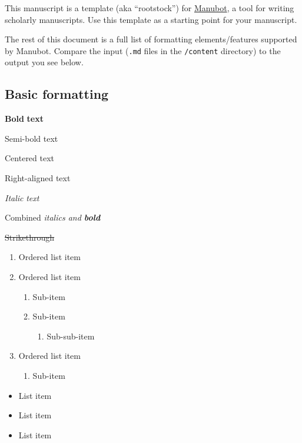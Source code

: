 This manuscript is a template (aka ``rootstock'') for \href{https://manubot.org/}{Manubot}, a tool for writing scholarly manuscripts.
Use this template as a starting point for your manuscript.

The rest of this document is a full list of formatting elements/features supported by Manubot.
Compare the input (\texttt{.md} files in the \texttt{/content} directory) to the output you see below.

\hypertarget{basic-formatting}{%
\subsection{Basic formatting}\label{basic-formatting}}

\textbf{Bold} \textbf{text}

{Semi-bold text}

{Centered text}

{Right-aligned text}

\emph{Italic} \emph{text}

Combined \emph{italics and \textbf{bold}}

\sout{Strikethrough}

\begin{enumerate}
\def\labelenumi{\arabic{enumi}.}
\tightlist
\item
  Ordered list item
\item
  Ordered list item

  \begin{enumerate}
  \def\labelenumii{\alph{enumii}.}
  \tightlist
  \item
    Sub-item
  \item
    Sub-item

    \begin{enumerate}
    \def\labelenumiii{\roman{enumiii}.}
    \tightlist
    \item
      Sub-sub-item
    \end{enumerate}
  \end{enumerate}
\item
  Ordered list item

  \begin{enumerate}
  \def\labelenumii{\alph{enumii}.}
  \tightlist
  \item
    Sub-item
  \end{enumerate}
\end{enumerate}

\begin{itemize}
\tightlist
\item
  List item
\item
  List item
\item
  List item
\end{itemize}

